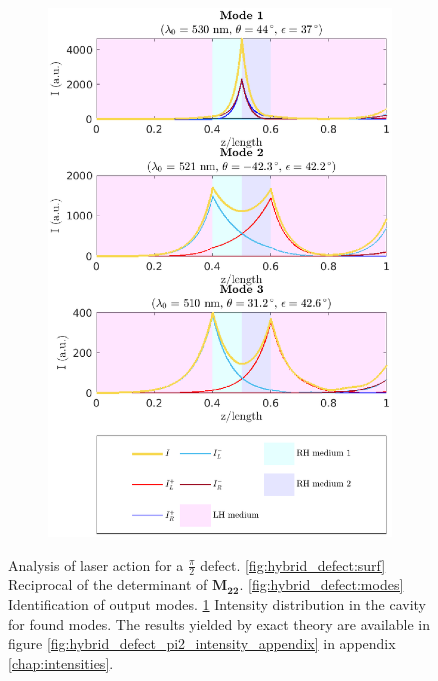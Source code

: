 \begin{figure}
\begin{subfigure}{0.48\linewidth}
		\includegraphics[width=\linewidth]{plots/hybrid_defect/pi_2/intensity_distribution}
		\caption{}
		\label{fig:hybrid_defect:intensity}
	\end{subfigure}
	\caption[Analysis of hybrid defect cavity]{Analysis of laser action for a $\frac{\pi}{2}$ defect. \ref{fig:hybrid_defect:surf} Reciprocal of the determinant of $\bm{M_{22}}$. \ref{fig:hybrid_defect:modes} Identification of output modes. \ref{fig:hybrid_defect:intensity} Intensity distribution in the cavity for found modes. The results yielded by exact theory are available in figure \ref{fig:hybrid_defect_pi2_intensity_appendix} in appendix \ref{chap:intensities}.}
	\label{fig:hybrid_defect:analysis}
\end{figure}

